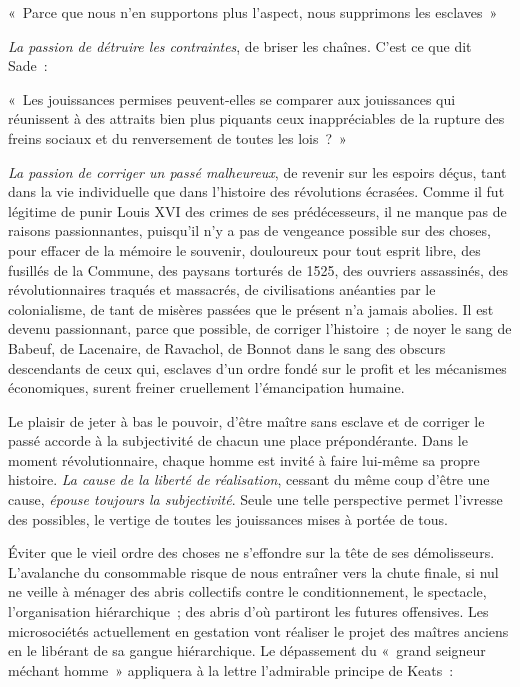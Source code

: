 \documentclass[french,twoside]{book} %
\newcommand{\astermono}{\medskip\centerline{\color{rubric}\large\selectfont{\syms ✻}}\medskip\par}%
\newcommand{\bibl}[1]{{\RaggedLeft{#1}\par\bigskip}}
\newenvironment{quoteblock}%
  {\begin{quoting}}
  {\end{quoting}}
\newenvironment{quotebar}{%
    \def\FrameCommand{{\color{rubric!10!}\vrule width 0.5em} \hspace{0.9em}}%
    \def\OuterFrameSep{\itemsep} %
    \MakeFramed {\advance\hsize-\width \FrameRestore}
  }%
  {%
    \endMakeFramed
  }
\renewenvironment{quoteblock}%
  {%
    \savenotes
    \setstretch{0.9}
    \normalfont
    \begin{quotebar}
  }
  {%
    \end{quotebar}
    \spewnotes
  }
\begin{document}
\begin{quoteblock}
 \noindent « Parce que nous n’en supportons plus l’aspect, nous supprimons les esclaves »\par
 
\bibl{(Nietzsche)}
 \end{quoteblock}

\noindent \emph{La passion de détruire les contraintes}, de briser les chaînes. C’est ce que dit Sade :\par

\begin{quoteblock}
\noindent « Les jouissances permises peuvent-elles se comparer aux jouissances qui réunissent à des attraits bien plus piquants ceux inappréciables de la rupture des freins sociaux et du renversement de toutes les lois ? »\end{quoteblock}

\noindent \emph{La passion de corriger un passé malheureux}, de revenir sur les espoirs déçus, tant dans la vie individuelle que dans l’histoire des révolutions écrasées. Comme il fut légitime de punir Louis XVI des crimes de ses prédécesseurs, il ne manque pas de raisons passionnantes, puisqu’il n’y a pas de vengeance possible sur des choses, pour effacer de la mémoire le souvenir, douloureux pour tout esprit libre, des fusillés de la Commune, des paysans torturés de 1525, des ouvriers assassinés, des révolutionnaires traqués et massacrés, de civilisations anéanties par le colonialisme, de tant de misères passées que le présent n’a jamais abolies. Il est devenu passionnant, parce que possible, de corriger l’histoire ; de noyer le sang de Babeuf, de Lacenaire, de Ravachol, de Bonnot dans le sang des obscurs descendants de ceux qui, esclaves d’un ordre fondé sur le profit et les mécanismes économiques, surent freiner cruellement l’émancipation humaine.\par
Le plaisir de jeter à bas le pouvoir, d’être maître sans esclave et de corriger le passé accorde à la subjectivité de chacun une place prépondérante. Dans le moment révolutionnaire, chaque homme est invité à faire lui-même sa propre histoire. \emph{La cause de la liberté de réalisation}, cessant du même coup d’être une cause, \emph{épouse toujours la subjectivité}. Seule une telle perspective permet l’ivresse des possibles, le vertige de toutes les jouissances mises à portée de tous.\par

\astermono

\noindent Éviter que le vieil ordre des choses ne s’effondre sur la tête de ses démolisseurs. L’avalanche du consommable risque de nous entraîner vers la chute finale, si nul ne veille à ménager des abris collectifs contre le conditionnement, le spectacle, l’organisation hiérarchique ; des abris d’où partiront les futures offensives. Les microsociétés actuellement en gestation vont réaliser le projet des maîtres anciens en le libérant de sa gangue hiérarchique. Le dépassement du « grand seigneur méchant homme » appliquera à la lettre l’admirable principe de Keats :\par
\end{document}
